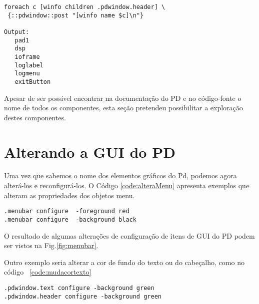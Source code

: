 \begin{lstlisting}[caption={Comando TCL para listar os elementos do cabeçalho},label={code:listaHeader}]
foreach c [winfo children .pdwindow.header] \
 {::pdwindow::post "[winfo name $c]\n"}

Output:
   pad1
   dsp
   ioframe
   loglabel
   logmenu
   exitButton
\end{lstlisting}

Apesar de ser possível encontrar na documentação do PD e no código-fonte o nome
de todos os componentes, esta seção pretendeu possibilitar a exploração destes
componentes.

\section{Alterando a GUI do PD}

Uma vez que sabemos o nome dos elementos gráficos do Pd, podemos agora
alterá-los e reconfigurá-los.
O Código \ref{code:alteraMenu} apresenta exemplos que alteram as propriedades
dos objetos menu.

\begin{lstlisting}[caption={Exemplo de alteração de menus do PD com Tcl (plugin exemplo \courier{menucolor-plugin.tcl}).},
label={code:alteraMenu}]
.menubar configure  -foreground red
.menubar configure  -background black
\end{lstlisting}

O resultado de algumas alterações de configuração de itens de GUI do PD podem ser
vistos na Fig.\ref{fig:menubar}.


Outro exemplo seria alterar a cor de fundo do texto ou do cabeçalho,
como no código ~\ref{code:mudacortexto}

\begin{lstlisting}[caption={Alteração da cor do texto de log e do cabeçalho.},label={code:mudacortexto}]
.pdwindow.text configure -background green
.pdwindow.header configure -background green
\end{lstlisting}



